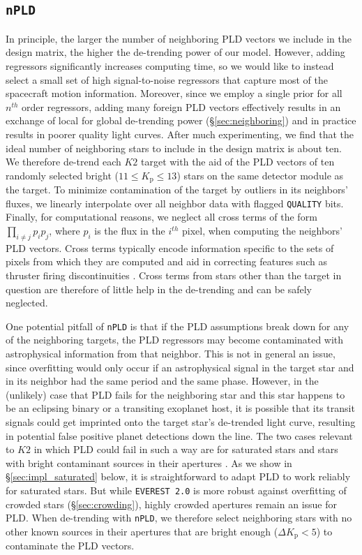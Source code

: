 \documentclass[]{emulateapj}
\newcommand{\Kp}{\ensuremath{K_\mathrm{p}}}
\begin{document}
\subsection{\texttt{nPLD}}
\label{sec:impl_neighboring}
In principle, the larger the number of neighboring PLD vectors we include in the
design matrix, the higher the de-trending power of our model. However, adding 
regressors significantly increases computing time, so we would like to instead select
a small set of high signal-to-noise regressors that capture most of the spacecraft
motion information. Moreover, since we employ a single prior for all $n^{th}$ order
regressors, adding many foreign PLD vectors effectively results in an exchange of
local for global de-trending power (\S\ref{sec:neighboring}) and in practice results
in poorer quality light curves. After much experimenting, we find that the ideal number
of neighboring stars to include in the design matrix is about ten. We therefore de-trend
each $K2$ target with the aid of the PLD vectors of ten randomly selected bright 
($11 \leq \Kp \leq 13$) stars on the same detector module as the target. To minimize
contamination of the target by outliers in its neighbors' fluxes, we linearly
interpolate over all neighbor data with flagged \texttt{QUALITY} bits. Finally, for
computational reasons, we neglect all cross terms of the form $\prod_{i \neq j} p_i p_j$,
where $p_i$ is the flux in the $i^{th}$ pixel,
when computing the neighbors' PLD vectors. Cross terms typically encode information
specific to the sets of pixels from which they are computed and aid in correcting
features such as thruster firing discontinuities \citep{Luger16}. Cross terms from
stars other than the target in question are therefore of little help in the de-trending
and can be safely neglected.

One potential pitfall of \texttt{nPLD} is that if the PLD assumptions break down for
any of the neighboring targets, the PLD regressors may become contaminated with
astrophysical information from that neighbor. This is not in general an issue, since
overfitting would only occur if an astrophysical signal in the target star and in
its neighbor had the same period and the same phase. However, in the (unlikely) case
that PLD fails for the neighboring star and this star happens to be an eclipsing binary 
or a transiting exoplanet host, it is possible that its transit signals could get imprinted onto
the target star's de-trended light curve, resulting in potential false positive planet
detections down the line. The two cases relevant to $K2$ in which PLD could fail in such
a way are for saturated stars and stars with bright contaminant sources in their
apertures \citep{Luger16}. As we show in \S\ref{sec:impl_saturated} below, it is 
straightforward to adapt PLD to work reliably for saturated stars. But while 
\texttt{EVEREST 2.0} is more robust against overfitting of crowded stars 
(\S\ref{sec:crowding}), highly crowded apertures remain an issue for PLD. When de-trending
with \texttt{nPLD}, we therefore select neighboring stars with no other known sources
in their apertures that are bright enough ($\Delta \Kp < 5$) to contaminate the PLD
vectors.
\end{document}
